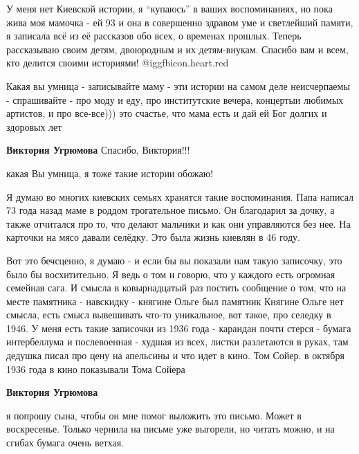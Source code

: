 \begin{itemize}
У меня нет Киевской истории, я \enquote{купаюсь} в ваших воспоминаниях, но пока жива
моя мамочка - ей 93 и она в совершенно здравом уме и светлейший памяти, я
записала всё из её рассказов обо всех, о временах прошлых. Теперь рассказываю
своим детям, двоюродным и их детям-внукам. Спасибо вам и всем, кто делится
своими историями! @igg{fbicon.heart.red}

\begin{itemize} %

Какая вы умница - записывайте маму - эти истории на самом деле неисчерпаемы -
спрашивайте - про моду и еду, про институтские вечера, концертыи любимых
артистов, и про все-все))) это счастье, что мама есть и дай ей Бог долгих и
здоровых лет


\textbf{Виктория Угрюмова} Спасибо, Виктория!!!

какая Вы умница, я тоже такие истории обожаю!
\end{itemize} %


Я думаю во многих киевских семьях хранятся такие воспоминания. Папа написал 73
года назад маме в роддом трогательное письмо. Он благодарил за дочку, а также
отчитался про то, что делают мальчики и как они управляются без нее. На карточки
на мясо давали селёдку. Это была жизнь киевлян в 46 году.

\begin{itemize} %

Вот это бечсценно, я думаю - и если бы вы показали нам такую записочку, это
было бы восхитительно. Я ведь о том и говорю, что у каждого есть огромная
семейная сага. И смысла в ковырнадцатый раз постить сообщение о том, что на
месте памятника - навскидку - княгине Ольге был памятник Княгине Ольге нет
смысла, есть смысл вывешивать что-то уникальное, вот такое, про селедку в 1946.
У меня есть такие записочки из 1936 года - карандан почти стерся - бумага
интербеллума и послевоенная - худшая из всех, листки разлетаются в руках, там
дедушка писал про цену на апельсины и что идет в кино. Том Сойер. в октября
1936 года в кино показывали Тома Сойера

\textbf{Виктория Угрюмова} 

я попрошу сына, чтобы он мне помог выложить это письмо. Может в воскресенье.
Только чернила на письме уже выгорели, но читать можно, и на сгибах бумага очень
ветхая.


\end{itemize}
\end{itemize}

